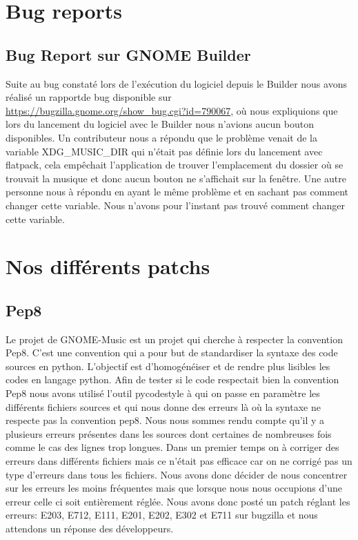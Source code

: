 \documentclass[12pt]{report}
\begin{document}
\section{Bug reports}
\subsection{Bug Report sur GNOME Builder}
Suite au bug constaté lors de l’exécution du logiciel depuis le Builder
nous avons réalisé un rapportde bug disponible sur 
\url{https://bugzilla.gnome.org/show_bug.cgi?id=790067}, où nous 
expliquions que lors du lancement du logiciel avec le Builder nous 
n'avions aucun bouton disponibles. Un contributeur nous a répondu que
le problème venait de la variable XDG\_MUSIC\_DIR qui n’était pas définie 
lors du lancement avec flatpack, cela empêchait l'application de trouver
l'emplacement du dossier où se trouvait la musique et donc aucun bouton
ne s'affichait sur la fenêtre. Une autre personne nous à répondu en 
ayant le même problème et en sachant pas comment changer cette variable.
Nous n'avons pour l'instant pas trouvé comment changer cette variable.

\section{Nos différents patchs}
\subsection{Pep8}
Le projet de GNOME-Music est un projet qui cherche à respecter la 
convention Pep8. C'est une convention qui a pour but de standardiser 
la syntaxe des code sources en  python. L'objectif est d’homogénéiser 
et de rendre plus lisibles les codes en langage python. Afin de tester 
si le code respectait bien la convention Pep8 nous avons utilisé l'outil
pycodestyle à qui on passe en paramètre les différents fichiers sources
et qui nous donne des erreurs là où la syntaxe ne respecte pas la 
convention pep8. Nous nous sommes rendu compte qu'il y a plusieurs erreurs
présentes dans les sources dont certaines de nombreuses fois comme le
cas des lignes trop longues. Dans un premier temps on à corriger des
erreurs dans différents fichiers mais ce n’était pas efficace car on 
ne corrigé pas un type d'erreurs dans tous les fichiers. Nous avons donc 
décider de nous concentrer sur les erreurs les moins fréquentes mais 
que lorsque nous nous occupions d'une erreur celle ci soit entièrement 
réglée. Nous avons donc posté un patch réglant les erreurs: E203, E712,
E111, E201, E202, E302 et E711 sur bugzilla et nous attendons un réponse 
des développeurs.
\end{document}
